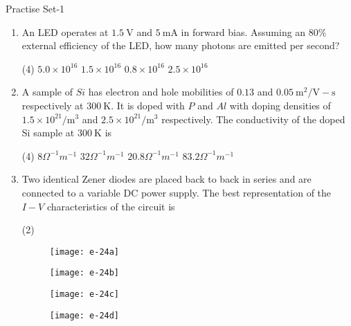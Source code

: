 \newpage
\begin{abox}
	Practise Set-1
\end{abox}
\begin{enumerate}
	\item An LED operates at $1.5 \mathrm{~V}$ and $5 \mathrm{~mA}$ in forward bias. Assuming an $80 \%$ external efficiency of the LED, how many photons are emitted per second?
	{	}
	\begin{tasks}(4)
		\task[\textbf{A.}] $5.0 \times 10^{16}$
		\task[\textbf{B.}]  $1.5 \times 10^{16}$
		\task[\textbf{C.}] $0.8 \times 10^{16}$
		\task[\textbf{D.}] $2.5 \times 10^{16}$
	\end{tasks}
	\item A sample of $S i$ has electron and hole mobilities of $0.13$ and $0.05 \mathrm{~m}^{2} / \mathrm{V}-\mathrm{s}$ respectively at $300 \mathrm{~K}$. It is doped with $P$ and $A l$ with doping densities of $1.5 \times 10^{21} / \mathrm{m}^{3}$ and $2.5 \times 10^{21} / \mathrm{m}^{3}$ respectively. The conductivity of the doped Si sample at $300 \mathrm{~K}$ is
	{	}
	\begin{tasks}(4)
		\task[\textbf{A.}] $8 \Omega^{-1} m^{-1}$
		\task[\textbf{B.}] $32 \Omega^{-1} m^{-1}$
		\task[\textbf{C.}] $20.8 \Omega^{-1} m^{-1}$
		\task[\textbf{D.}] $83.2 \Omega^{-1} m^{-1}$
	\end{tasks}
	\item Two identical Zener diodes are placed back to back in series and are connected to a variable DC power supply. The best representation of the $I-V$ characteristics of the circuit is
	{	}
	\begin{tasks}(2)
		\task[\textbf{A.}] \begin{figure}[H]
			\centering
			\texttt{[image: e-24a]}
		\end{figure}
		\task[\textbf{B.}] \begin{figure}[H]
			\centering
			\texttt{[image: e-24b]}
		\end{figure}
		\task[\textbf{C.}] \begin{figure}[H]
			\centering
			\texttt{[image: e-24c]}
		\end{figure}
		\task[\textbf{D.}] \begin{figure}[H]
			\centering
			\texttt{[image: e-24d]}
		\end{figure}
	\end{tasks}

\end{enumerate}
